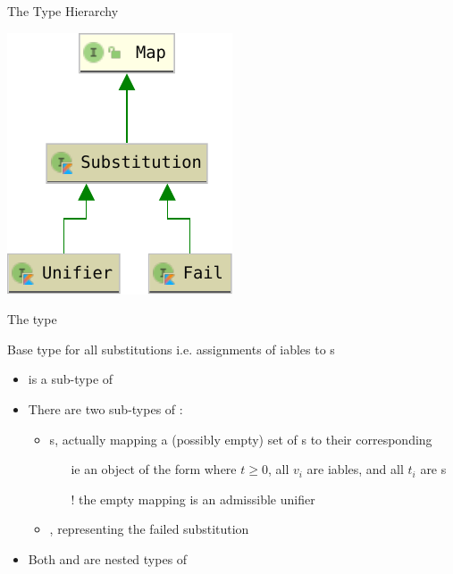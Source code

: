 \documentclass[handout]{beamer}
\begin{document}
\begin{frame}[allowframebreaks]{The  Type Hierarchy}
    \begin{center}
        \includegraphics[width=.4\linewidth]{img/Substitution.pdf}
    \end{center}

    \begin{block}{The  type}\centering
        \begin{center}
            Base type for all \alert{substitutions} i.e. assignments of iables to s
        \end{center}
        \begin{itemize}
            \item {} is a sub-type of 

            \item There are two sub-types of :
            \begin{itemize}
                \item \alert{s}, actually mapping a (possibly empty) set of s to their corresponding 
                \begin{itemize}
                    \item[ie] an object of the form  where $t \geq 0$, all $v_i$ are iables, and all $t_i$ are s
                    \item[!] the empty mapping is an admissible unifier
                \end{itemize}
                \item \alert{}, representing the \alert{failed} substitution
            \end{itemize}

            \item Both  and  are nested types of 
        \end{itemize}
    \end{block}


\end{frame}
\end{document}

